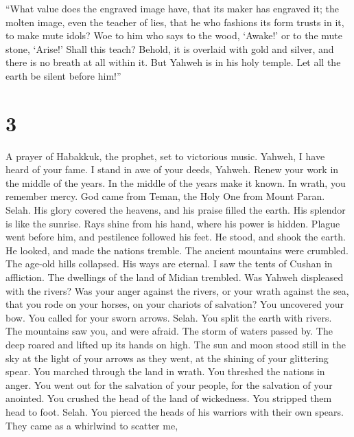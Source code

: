  ``What value does the engraved image have, that its
maker has engraved it; the molten image, even the teacher of lies, that
he who fashions its form trusts in it, to make mute idols?
 Woe to him who says to the wood, `Awake!' or to the mute
stone, `Arise!' Shall this teach? Behold, it is overlaid with gold and
silver, and there is no breath at all within it.  But
Yahweh is in his holy temple. Let all the earth be silent before him!''

\hypertarget{section-2}{%
\section{3}\label{section-2}}

 A prayer of Habakkuk, the prophet, set to victorious
music.  Yahweh, I have heard of your fame. I stand in awe
of your deeds, Yahweh. Renew your work in the middle of the years. In
the middle of the years make it known. In wrath, you remember mercy.
 God came from Teman, the Holy One from Mount Paran.
Selah. His glory covered the heavens, and his praise filled the earth.
 His splendor is like the sunrise. Rays shine from his
hand, where his power is hidden.  Plague went before him,
and pestilence followed his feet.  He stood, and shook the
earth. He looked, and made the nations tremble. The ancient mountains
were crumbled. The age-old hills collapsed. His ways are eternal.
 I saw the tents of Cushan in affliction. The dwellings of
the land of Midian trembled.  Was Yahweh displeased with
the rivers? Was your anger against the rivers, or your wrath against the
sea, that you rode on your horses, on your chariots of salvation?
 You uncovered your bow. You called for your sworn arrows.
Selah. You split the earth with rivers.  The mountains
saw you, and were afraid. The storm of waters passed by. The deep roared
and lifted up its hands on high.  The sun and moon stood
still in the sky at the light of your arrows as they went, at the
shining of your glittering spear.  You marched through
the land in wrath. You threshed the nations in anger. 
You went out for the salvation of your people, for the salvation of your
anointed. You crushed the head of the land of wickedness. You stripped
them head to foot. Selah.  You pierced the heads of his
warriors with their own spears. They came as a whirlwind to scatter me,
